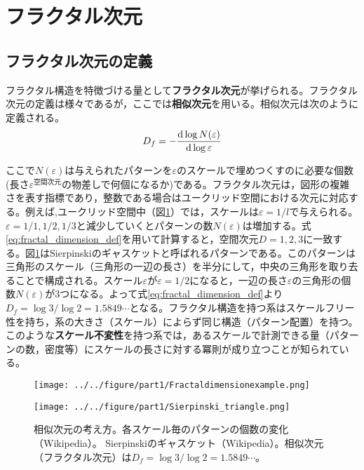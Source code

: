 \documentclass[autodetect-engine,dvi=dvipdfmx,a4paper,ja=standard,oneside,openany,11pt]{bxjsbook}
\begin{document}
\section{フラクタル次元}
\label{sec:fractal_dimension}
\subsection{フラクタル次元の定義}
フラクタル構造を特徴づける量として\textbf{フラクタル次元}が挙げられる。フラクタル次元の定義は様々であるが，ここでは\textbf{相似次元}を用いる。相似次元は次のように定義される。
\begin{equation}
  D_f=-\odv{\log N(\varepsilon)}{\log \varepsilon}
  \label{eq:fractal_dimension_def}
\end{equation}

ここで$N(\varepsilon)$は与えられたパターンを$\varepsilon$のスケールで埋めつくすのに必要な個数(長さ$\varepsilon^{\mathrm{空間次元}}$の物差しで何個になるか)である。フラクタル次元は，図形の複雑さを表す指標であり，整数である場合はユークリッド空間における次元に対応する。例えば,ユークリッド空間中（図\ref{fig:fractal_stracture}）では，スケールは$\varepsilon=1/l$で与えられる。$\varepsilon=1/1,1/2,1/3$と減少していくとパターンの数$N(\varepsilon)$は増加する。式\eqref{eq:fractal_dimension_def}を用いて計算すると，空間次元$D=1,2,3$に一致する。図\ref{fig:fractal_stracture}はSierpinskiのギャスケットと呼ばれるパターンである。このパターンは三角形のスケール（三角形の一辺の長さ）を半分にして，中央の三角形を取り去ることで構成される。スケール$\varepsilon$が$\varepsilon=1/2$になると，一辺の長さ$\varepsilon$の三角形の個数$N(\varepsilon)$が3つになる。よって式\eqref{eq:fractal_dimension_def}より$D_f=\log 3/\log 2=1.5849\cdots$となる。フラクタル構造を持つ系はスケールフリー性を持ち，系の大きさ（スケール）によらず同じ構造（パターン配置）を持つ。このような\textbf{スケール不変性}を持つ系では，あるスケールで計測できる量（パターンの数，密度等）にスケールの長さに対する冪則が成り立つことが知られている。

\begin{figure}[htbp]
  \begin{minipage}{0.45\textwidth}
    \centering
    \subcaption{}
    \texttt{[image: ../../figure/part1/Fractaldimensionexample.png]}
    \label{fig:相似次元の考え方}
  \end{minipage}
  \begin{minipage}{0.45\textwidth}
    \centering
    \subcaption{}
    \texttt{[image: ../../figure/part1/Sierpinski\_triangle.png]}
    \label{fig:シェルピンスキーのギャスケット}
  \end{minipage}
  \caption{相似次元の考え方。各スケール毎のパターンの個数の変化（Wikipedia）。 Sierpinskiのギャスケット（Wikipedia）。相似次元（フラクタル次元）は$D_f=\log 3/\log 2=1.5849\cdots$。}
  \label{fig:fractal_stracture}
\end{figure}
\end{document}
